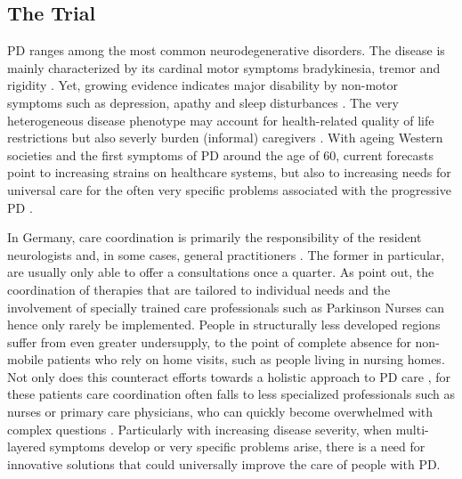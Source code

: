 \documentclass[number,12pt,review]{elsarticle}
\begin{document}
\label{backsec}

\subsection{The Trial}

\label{trialsec}

\ac{PD} ranges among the most common neurodegenerative disorders. The disease is mainly characterized by its cardinal motor symptoms bradykinesia, tremor and rigidity \citep{Bloem2021-ov}. Yet, growing evidence indicates major disability by non-motor symptoms such as depression, apathy and sleep disturbances \citep{Bloem2021-ov}. The very heterogeneous disease phenotype may account for health-related quality of life restrictions but also severly burden (informal) caregivers \citep{Kalia2015-ty}. With ageing Western societies and the first symptoms of \ac{PD} around the age of 60, current forecasts point to increasing strains on healthcare systems, but also to increasing needs for universal care for the often very specific problems associated with the progressive \ac{PD} \citep{Heinzel2018-ff, Dorsey2018-mc}.

In Germany, care coordination is primarily the responsibility of the resident neurologists and, in some cases, general practitioners \citep{Stangl2020-na}. The former in particular, are usually only able to offer a consultations once a quarter. As \citet{Prell2020-bc} point out, the coordination of therapies that are tailored to individual needs and the involvement of specially trained care professionals such as Parkinson Nurses can hence only rarely be implemented. People in structurally less developed regions suffer from even greater undersupply, to the point of complete absence for non-mobile patients who rely on home visits, such as people living in nursing homes. Not only does this counteract efforts towards a holistic approach to PD care \citep{rajan2020integrated}, for these patients care coordination often falls to less specialized professionals such as nurses or primary care physicians, who can quickly become overwhelmed with complex questions \citep{Stangl2020-na}. Particularly with increasing disease severity, when multi-layered symptoms develop or very specific problems arise, there is a need for innovative solutions that could universally improve the care of people with \ac{PD}.
\end{document}
